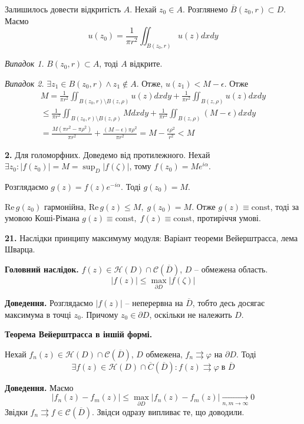 \documentclass[14pt]{extarticle}
\begin{document}
Залишилось довести відкритість $A$. Нехай $z_0 \in A$. Розглянемо $\overline{B}(z_0,r) \subset D$. Маємо
\[
u(z_0) = \frac{1}{\pi r^2}\iint_{B(z_0,r)} u(z)dxdy
\]

\textit{Випадок 1.} $B(z_0,r) \subset A$, тоді $A$ відкрите.

\textit{Випадок 2.} $\exists z_1 \in B(z_0,r) \wedge z_1 \not\in A$. Отже, $u(z_1) < M-\epsilon$. Отже
\begin{gather*}
M = \frac{1}{\pi r^2}\iint_{B(z_0,r) \setminus B(z,\rho)} u(z)dxdy + \frac{1}{\pi r^2}\iint_{B(z,\rho)} u(z)dxdy \\ \leq \frac{1}{\pi r^2}\iint_{B(z_0,r) \setminus B(z,\rho)} Mdxdy + \frac{1}{\pi r^2}\iint_{B(z,\rho)} (M-\epsilon)dxdy \\
= \frac{M(\pi r^2 - \pi \rho^2)}{\pi r^2} + \frac{(M-\epsilon)\pi \rho^2}{\pi r^2} = M - \frac{\epsilon \rho^2}{r^2} < M
\end{gather*}

\textbf{2.} Для голоморфних. Доведемо від протилежного. Нехай $\exists z_0: |f(z_0)|=M = \sup_{D}|f(\zeta)|$, тому $f(z_0)=Me^{i\alpha}$.

Розглядаємо $g(z)=f(z)e^{-i\alpha}$. Тоді $g(z_0)=M$.

$\text{Re}\, g(z_0)$ гармонійна, $\text{Re} \, g(z) \leq M, \; g(z_0) = M$. Отже $g(z) \equiv \text{const}$, тоді за умовою Коші-Рімана $g(z) \equiv \text{const}, \; f(z) \equiv \text{const}$, протиріччя умові. 

\textbf{21.} Наслідки принципу максимуму модуля: Варіант теореми Вейерштрасса, лема Шварца.

\textbf{Головний наслідок.} $f(z) \in \mathcal{H}(D) \cap \mathcal{C}(\overline{D})$, $D$ -- обмежена область. 
\[
|f(z)| \leq \max_{\partial D}|f(\zeta)|
\]

\textbf{Доведення.} Розглядаємо $|f(z)|$ -- неперервна на $\overline{D}$, тобто десь досягає максимума в точці $z_0$. Причому $z_0 \in \partial D$, оскільки не належить $D$.  

\textbf{Теорема Вейерштрасса в іншій формі.} 

Нехай $f_n(z) \in \mathcal{H}(D) \cap \mathcal{C}(\overline{D})$, $D$ обмежена, $f_n \rightrightarrows \varphi$ на $\partial D$. Тоді 
\[
\exists f(z) \in \mathcal{H}(D) \cap \overline{C}(\overline{D}): f(z) \rightrightarrows \varphi \; \text{в $\overline{D}$}
\]

\textbf{Доведення.} Маємо
\[
|f_n(z)-f_m(z)| \leq \max_{\partial D} |f_n(z) - f_m(z)| \xrightarrow[n,m \to \infty]{} 0
\]
Звідки $f_n \rightrightarrows f \in \mathcal{C}(\overline{D})$. Звідси одразу випливає те, що доводили.
\end{document}

